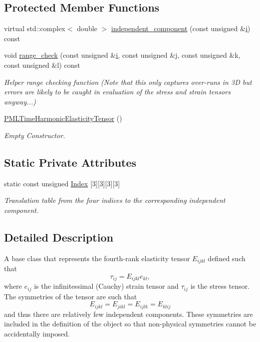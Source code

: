 \subsection*{Protected Member Functions}
\begin{DoxyCompactItemize}
\item 
virtual std\+::complex$<$ double $>$ \hyperlink{classoomph_1_1PMLTimeHarmonicElasticityTensor_a80876070e0c45dd00bbc21fe9c527a21}{independent\+\_\+component} (const unsigned \&\hyperlink{cfortran_8h_adb50e893b86b3e55e751a42eab3cba82}{i}) const
\item 
void \hyperlink{classoomph_1_1PMLTimeHarmonicElasticityTensor_acc5d6de5e961ad67dd72bf032a47bb7b}{range\+\_\+check} (const unsigned \&\hyperlink{cfortran_8h_adb50e893b86b3e55e751a42eab3cba82}{i}, const unsigned \&j, const unsigned \&k, const unsigned \&l) const
\begin{DoxyCompactList}\small\item\em Helper range checking function (Note that this only captures over-\/runs in 3D but errors are likely to be caught in evaluation of the stress and strain tensors anyway...) \end{DoxyCompactList}\item 
\hyperlink{classoomph_1_1PMLTimeHarmonicElasticityTensor_a487ea0dfb56150b4189f1bc514a9bdda}{P\+M\+L\+Time\+Harmonic\+Elasticity\+Tensor} ()
\begin{DoxyCompactList}\small\item\em Empty Constructor. \end{DoxyCompactList}\end{DoxyCompactItemize}
\subsection*{Static Private Attributes}
\begin{DoxyCompactItemize}
\item 
static const unsigned \hyperlink{classoomph_1_1PMLTimeHarmonicElasticityTensor_a26ab48ec65967f3ff8687d2208b337f6}{Index} \mbox{[}3\mbox{]}\mbox{[}3\mbox{]}\mbox{[}3\mbox{]}\mbox{[}3\mbox{]}
\begin{DoxyCompactList}\small\item\em Translation table from the four indices to the corresponding independent component. \end{DoxyCompactList}\end{DoxyCompactItemize}


\subsection{Detailed Description}
A base class that represents the fourth-\/rank elasticity tensor $E_{ijkl}$ defined such that \[\tau_{ij} = E_{ijkl} e_{kl},\] where $e_{ij}$ is the infinitessimal (Cauchy) strain tensor and $\tau_{ij}$ is the stress tensor. The symmetries of the tensor are such that \[E_{ijkl} = E_{jikl} = E_{ijlk} = E_{klij}\] and thus there are relatively few independent components. These symmetries are included in the definition of the object so that non-\/physical symmetries cannot be accidentally imposed. 

